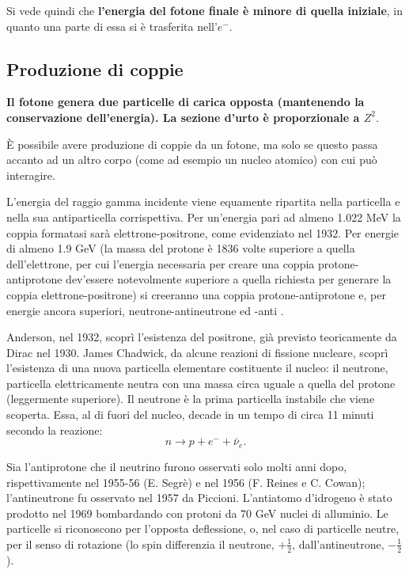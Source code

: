 \documentclass[a4paper,11pt,twoside,openany]{book}
\theoremstyle{definition}
\theoremstyle{plain}
\theoremstyle{plain}
\theoremstyle{definition}
\begin{document}
Si vede quindi che \textbf{l'energia del fotone finale è minore di quella iniziale}, in quanto una parte di essa si è trasferita nell'$e^-$.

\subsection{Produzione di coppie} %
\textbf{Il fotone genera due particelle di carica opposta (mantenendo la conservazione dell'energia). La sezione d'urto è proporzionale a $Z^2$}.

È possibile avere produzione di coppie da un fotone, ma solo se questo passa accanto ad un altro corpo (come ad esempio un nucleo atomico) con cui può interagire.

L'energia del raggio gamma incidente viene equamente ripartita nella particella e nella sua antiparticella corrispettiva. Per un'energia pari ad almeno 1.022 MeV la coppia formatasi sarà elettrone-positrone, come evidenziato nel 1932. Per energie di almeno 1.9 GeV (la massa del protone è 1836 volte superiore a quella dell'elettrone, per cui l'energia necessaria per creare una coppia protone-antiprotone dev'essere notevolmente superiore a quella richiesta per generare la coppia elettrone-positrone) si creeranno una coppia protone-antiprotone e, per energie ancora superiori, neutrone-antineutrone ed -anti .

Anderson, nel 1932, scoprì l'esistenza del positrone, già previsto teoricamente da Dirac nel 1930. James Chadwick, da alcune reazioni di fissione nucleare, scoprì l'esistenza di una nuova particella elementare costituente il nucleo: il neutrone, particella elettricamente neutra con una massa circa uguale a quella del protone (leggermente superiore). Il neutrone è la prima particella instabile che viene scoperta. Essa, al di fuori del nucleo, decade in un tempo di circa 11 minuti secondo la reazione:
\begin{equation}
n \longrightarrow p + e^- + \bar\nu_e.
\end{equation}

Sia l'antiprotone che il neutrino furono osservati solo molti anni dopo, rispettivamente nel 1955-56 (E. Segrè) e nel 1956 (F. Reines e C. Cowan); l'antineutrone fu osservato nel 1957 da Piccioni. L'antiatomo d'idrogeno è stato prodotto nel 1969 bombardando con protoni da 70 GeV nuclei di alluminio. Le particelle si riconoscono per l'opposta deflessione, o, nel caso di particelle neutre, per il senso di rotazione (lo spin differenzia il neutrone, $+\frac{1}{2}$, dall'antineutrone, $-\frac{1}{2}$).
\end{document}

